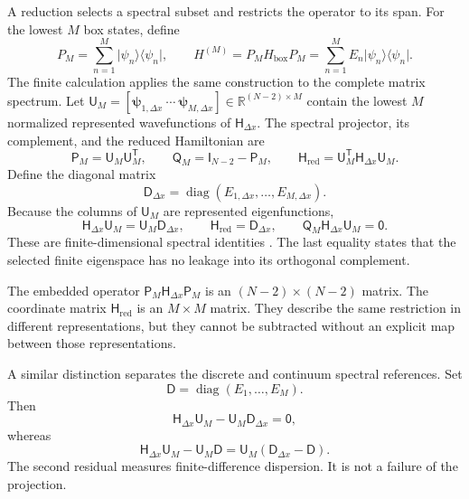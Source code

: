 \documentclass[11pt]{article}
\newcommand{\RR}{\mathbb{R}}
\newcommand{\mat}[1]{\mathsf{#1}}
\newcommand{\vect}[1]{\boldsymbol{#1}}
\begin{document}
A reduction selects a spectral subset and restricts the operator to its span. For the
lowest $M$ box states, define
\begin{equation}
 P_M=\sum_{n=1}^{M}\lvert\psi_n\rangle\langle\psi_n\rvert,
 \qquad
 H^{(M)}=P_MH_{\mathrm{box}}P_M
 =\sum_{n=1}^{M}E_n\lvert\psi_n\rangle\langle\psi_n\rvert.
 \label{eq:continuum-operator-reduction}
\end{equation}
The finite calculation applies the same construction to the complete matrix spectrum.
Let
$\mat{U}_M=[\vect{\psi}_{1,\Delta x}\ \cdots\ \vect{\psi}_{M,\Delta x}]
\in\RR^{(N-2)\times M}$ contain the lowest $M$ normalized represented wavefunctions
of $\mat{H}_{\Delta x}$. The spectral projector, its
complement, and the reduced Hamiltonian are
\begin{equation}
 \mat{P}_M=\mat{U}_M\mat{U}_M^{\mathsf T},\qquad
 \mat{Q}_M=\mat{I}_{N-2}-\mat{P}_M,\qquad
 \mat{H}_{\mathrm{red}}
 =\mat{U}_M^{\mathsf T}\mat{H}_{\Delta x}\mat{U}_M.
 \label{eq:reduction-definitions}
\end{equation}
Define the diagonal matrix
\begin{equation}
 \mat{D}_{\Delta x}
 =\operatorname{diag}(E_{1,\Delta x},\ldots,E_{M,\Delta x}).
\end{equation}
Because the columns of $\mat{U}_M$ are represented eigenfunctions,
\begin{equation}
 \mat{H}_{\Delta x}\mat{U}_M=\mat{U}_M\mat{D}_{\Delta x},\qquad
 \mat{H}_{\mathrm{red}}=\mat{D}_{\Delta x},\qquad
 \mat{Q}_M\mat{H}_{\Delta x}\mat{U}_M=\mat{0}.
 \label{eq:exact-reduction}
\end{equation}
These are finite-dimensional spectral identities
\cite{hornJohnson2013,golubVanLoan2013}. The last equality states that the selected
finite eigenspace has no leakage into its orthogonal complement.

The embedded operator $\mat{P}_M\mat{H}_{\Delta x}\mat{P}_M$ is an
$(N-2)\times(N-2)$ matrix. The coordinate matrix $\mat{H}_{\mathrm{red}}$ is an $M\times M$ matrix. They describe
the same restriction in different representations, but they cannot be subtracted
without an explicit map between those representations.

A similar distinction separates the discrete and continuum spectral references. Set
\begin{equation}
 \mat{D}=\operatorname{diag}(E_1,\ldots,E_M).
\end{equation}
Then
\begin{equation}
 \mat{H}_{\Delta x}\mat{U}_M
 -\mat{U}_M\mat{D}_{\Delta x}=\mat{0},
 \label{eq:discrete-reference-residual}
\end{equation}
whereas
\begin{equation}
 \mat{H}_{\Delta x}\mat{U}_M-\mat{U}_M\mat{D}
 =\mat{U}_M(\mat{D}_{\Delta x}-\mat{D}).
 \label{eq:continuum-reference-residual}
\end{equation}
The second residual measures finite-difference dispersion. It is not a failure of the
projection.
\end{document}
